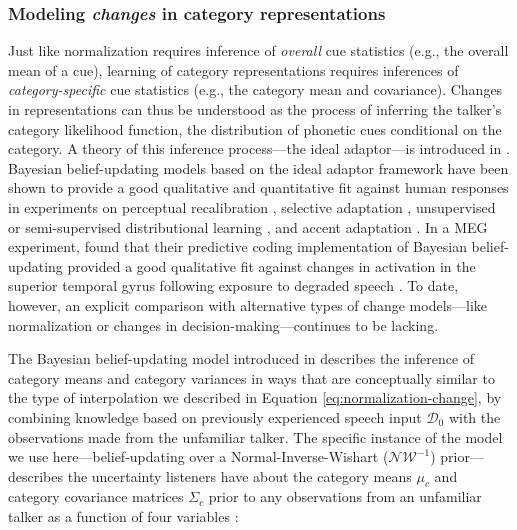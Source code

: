 \documentclass[
  11pt,
  man,floatsintext]{apa6}
\begin{document}
\hypertarget{sec:ideal-adaptor}{%
\subsubsection{\texorpdfstring{Modeling \emph{changes} in category representations}{Modeling changes in category representations}}\label{sec:ideal-adaptor}}

Just like normalization requires inference of \emph{overall} cue statistics (e.g., the overall mean of a cue), learning of category representations requires inferences of \emph{category-specific} cue statistics (e.g., the category mean and covariance). Changes in representations can thus be understood as the process of inferring the talker's category likelihood function, the distribution of phonetic cues conditional on the category. A theory of this inference process---the ideal adaptor---is introduced in \textcite{kleinschmidt-jaeger2015}. Bayesian belief-updating models based on the ideal adaptor framework have been shown to provide a good qualitative and quantitative fit against human responses in experiments on perceptual recalibration \autocites{kleinschmidt-jaeger2011,kleinschmidt-jaeger2012}[for closely related models, see][]{xie2021cognition}, selective adaptation \autocite{kleinschmidt-jaeger2016pbr}, unsupervised or semi-supervised distributional learning \autocites[e.g.,][]{kim2020,kleinschmidt-jaeger2016cogsci,theodore-monto2019}[for closely related model, see][]{bejjanki2011,clayards2008}, and accent adaptation \autocites{hitczenko-feldman2016}[for a closely related model, see][]{tan2021}. In a MEG experiment, \textcite{sohoglu-davis2016} found that their predictive coding implementation of Bayesian belief-updating provided a good qualitative fit against changes in activation in the superior temporal gyrus following exposure to degraded speech \autocite[see also][]{davis-sohoglu2020}. To date, however, an explicit comparison with alternative types of change models---like normalization or changes in decision-making---continues to be lacking.

The Bayesian belief-updating model introduced in \textcite{kleinschmidt-jaeger2015} describes the inference of category means and category variances in ways that are conceptually similar to the type of interpolation we described in Equation \eqref{eq:normalization-change}, by combining knowledge based on previously experienced speech input \(\mathcal{D}_0\) with the observations made from the unfamiliar talker. The specific instance of the model we use here---belief-updating over a Normal-Inverse-Wishart (\(\mathcal{NW^{-1}}\)) prior---describes the uncertainty listeners have about the category means \(\mu_c\) and category covariance matrices \(\Sigma_c\) prior to any observations from an unfamiliar talker as a function of four variables \autocite[p.~132-3]{murphy2012}:
\end{document}
